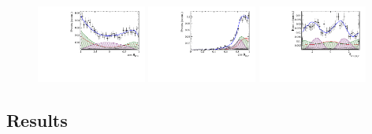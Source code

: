 \begin{figure}[h]
		\includegraphics[width=0.32\textwidth, height = !]{figs/lassoFit/LASSO/h_cosTheta_Kpi_mod.pdf} 
		\includegraphics[width=0.32\textwidth, height = !]{figs/lassoFit/LASSO/h_cosTheta_Dspi_mod.pdf} 
		\includegraphics[width=0.32\textwidth, height = !]{figs/lassoFit/LASSO/h_phi_Kpi_Dspi_mod.pdf} 

		\caption{} 		
\end{figure}	

\subsection{Results}









